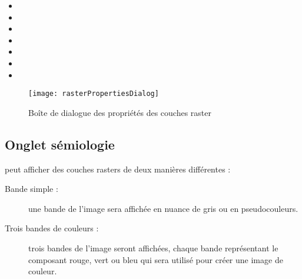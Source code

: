 \begin{itemize}[label=--]
 \item {}
 \item {}
 \item {}
 \item {}
 \item {}
 \item {}
 \item {}
\end{itemize}

\begin{figure}[htb]
  \begin{center}
   \texttt{[image: rasterPropertiesDialog]}
   \caption{Boîte de dialogue des propriétés des couches raster
\nixcaption}\label{fig:raster_properties}
\end{center}
\end{figure}

\subsection{Onglet sémiologie}\label{label_sombology}

\qg peut afficher des couches rasters de deux manières différentes
:

\begin{description}
\item[Bande simple :] une bande de l'image sera affichée en nuance de gris ou en pseudocouleurs.
\item[Trois bandes de couleurs :] trois bandes de l'image seront affichées,
chaque bande représentant le composant rouge, vert ou bleu qui sera utilisé pour créer une image de couleur.
\end{description}

